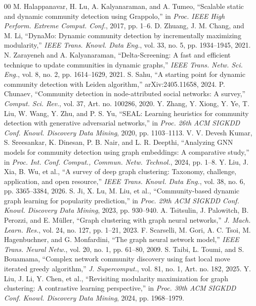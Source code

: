 \documentclass[conference]{IEEEtran}
\theoremstyle{definition}
\begin{document}
\begin{thebibliography}{00}
    M. Halappanavar, H. Lu, A. Kalyanaraman, and A. Tumeo, ``Scalable static and dynamic community detection using Grappolo,'' in \textit{Proc. IEEE High Perform. Extreme Comput. Conf.}, 2017, pp. 1--6.
    D. Zhuang, J. M. Chang, and M. Li, ``DynaMo: Dynamic community detection by incrementally maximizing modularity,'' \textit{IEEE Trans. Knowl. Data Eng.}, vol. 33, no. 5, pp. 1934--1945, 2021.
    N. Zarayeneh and A. Kalyanaraman, ``Delta-Screening: A fast and efficient technique to update communities in dynamic graphs,'' \textit{IEEE Trans. Netw. Sci. Eng.}, vol. 8, no. 2, pp. 1614--1629, 2021.
    S. Sahu, ``A starting point for dynamic community detection with Leiden algorithm,'' arXiv:2405.11658, 2024.
    P. Chunaev, ``Community detection in node-attributed social networks: A survey,'' \textit{Comput. Sci. Rev.}, vol. 37, Art. no. 100286, 2020.
    Y. Zhang, Y. Xiong, Y. Ye, T. Liu, W. Wang, Y. Zhu, and P. S. Yu, ``SEAL: Learning heuristics for community detection with generative adversarial networks,'' in \textit{Proc. 26th ACM SIGKDD Conf. Knowl. Discovery Data Mining}, 2020, pp. 1103--1113.
    V. V. Devesh Kumar, S. Sreesankar, K. Dinesan, P. B. Nair, and L. R. Deepthi, ``Analyzing GNN models for community detection using graph embeddings: A comparative study,'' in \textit{Proc. Int. Conf. Comput., Commun. Netw. Technol.}, 2024, pp. 1--8.
    Y. Liu, J. Xia, B. Wu, et al., ``A survey of deep graph clustering: Taxonomy, challenge, application, and open resource,'' \textit{IEEE Trans. Knowl. Data Eng.}, vol. 38, no. 6, pp. 3365--3384, 2026.
    S. Ji, X. Lu, M. Liu, et al., ``Community-based dynamic graph learning for popularity prediction,'' in \textit{Proc. 29th ACM SIGKDD Conf. Knowl. Discovery Data Mining}, 2023, pp. 930--940.
    A. Tsitsulin, J. Palowitch, B. Perozzi, and E. M{\"u}ller, ``Graph clustering with graph neural networks,'' \textit{J. Mach. Learn. Res.}, vol. 24, no. 127, pp. 1--21, 2023.
    F. Scarselli, M. Gori, A. C. Tsoi, M. Hagenbuchner, and G. Monfardini, ``The graph neural network model,'' \textit{IEEE Trans. Neural Netw.}, vol. 20, no. 1, pp. 61--80, 2009.
    S. Taibi, L. Toumi, and S. Bouamama, ``Complex network community discovery using fast local move iterated greedy algorithm,'' \textit{J. Supercomput.}, vol. 81, no. 1, Art. no. 182, 2025.
    Y. Liu, J. Li, Y. Chen, et al., ``Revisiting modularity maximization for graph clustering: A contrastive learning perspective,'' in \textit{Proc. 30th ACM SIGKDD Conf. Knowl. Discovery Data Mining}, 2024, pp. 1968--1979.

\end{thebibliography}
\end{document}
